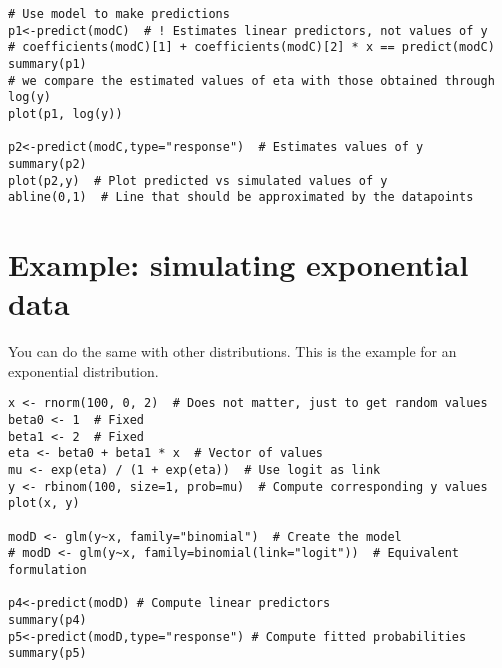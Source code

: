 \begin{verbatim}
# Use model to make predictions
p1<-predict(modC)  # ! Estimates linear predictors, not values of y
# coefficients(modC)[1] + coefficients(modC)[2] * x == predict(modC)
summary(p1)  
# we compare the estimated values of eta with those obtained through log(y)
plot(p1, log(y))

p2<-predict(modC,type="response")  # Estimates values of y
summary(p2)
plot(p2,y)  # Plot predicted vs simulated values of y
abline(0,1)  # Line that should be approximated by the datapoints 
\end{verbatim}

\section{Example: simulating exponential data}
You can do the same with other distributions. This is the example for an exponential distribution.

\begin{verbatim}
x <- rnorm(100, 0, 2)  # Does not matter, just to get random values 
beta0 <- 1  # Fixed
beta1 <- 2  # Fixed
eta <- beta0 + beta1 * x  # Vector of values
mu <- exp(eta) / (1 + exp(eta))  # Use logit as link
y <- rbinom(100, size=1, prob=mu)  # Compute corresponding y values
plot(x, y)

modD <- glm(y~x, family="binomial")  # Create the model
# modD <- glm(y~x, family=binomial(link="logit"))  # Equivalent formulation

p4<-predict(modD) # Compute linear predictors
summary(p4)
p5<-predict(modD,type="response") # Compute fitted probabilities
summary(p5)
\end{verbatim}
